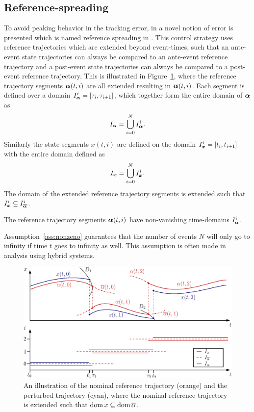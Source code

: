 \documentclass[../DC2017114Bouma.tex]{subfiles}
\begin{document}
\subsection{Reference-spreading}
To avoid peaking behavior in the tracking error, in \cite{Saccon2014} a novel notion of error is presented which is named reference spreading in \cite{Rijnen2016}. This control strategy uses reference trajectories which are extended beyond event-times, such that an ante-event state trajectories can always be compared to an ante-event reference trajectory and a post-event state trajectories can always be compared to a post-event reference trajectory. This is illustrated in Figure~\ref{fig:3refspread}, where the reference trajectory segments $\boldsymbol{\alpha}(t,i)$ are all extended resulting in $\overline{\boldsymbol{\alpha}}(t,i)$. Each segment is defined over a domain $I^i_{\boldsymbol{\alpha}} = [\tau_i,\tau_{i+1}]$, which together form the entire domain of $\boldsymbol{\alpha}$ as
\begin{align}
I_{\boldsymbol{\alpha}} = \bigcup^N_{i=0}I_{\boldsymbol{\alpha}}^i.
\end{align}
Similarly the state segments $x(t,i)$ are defined on the domain $I^i_{\boldsymbol{x}} = [t_i,t_{i+1}]$ with the entire domain defined as
\begin{align}
I_{\boldsymbol{x}} = \bigcup^N_{i=0}I_{{\boldsymbol{x}}}^i.
\end{align}
The domain of the extended reference trajectory segments is extended such that $I_{{\boldsymbol{x}}}^i\subseteq I_{\overline{\boldsymbol{\alpha}}}^i$.

\begin{myass}
The reference trajectory segments $\boldsymbol{\alpha}(t,i)$ have non-vanishing time-domains $I_{\boldsymbol{\alpha}}^i$.\label{ass:nonzeno}
\end{myass}

Assumption~\ref{ass:nonzeno} guarantees that the number of events $N$ will only go to infinity if time $t$ goes to infinity as well. This assumption is often made in analysis using hybrid systems.

\begin{figure}[h]
\centering
\includegraphics[width=.8\textwidth]{refspreaddom.eps}\caption{An illustration of the nominal reference trajectory (orange) and the perturbed trajectory (cyan), where the nominal reference trajectory is extended such that $\operatorname{\textnormal{dom}} x\subseteq\operatorname{\textnormal{dom}} \overline{\alpha}$.} \label{fig:3refspread}
\end{figure}
\end{document}
